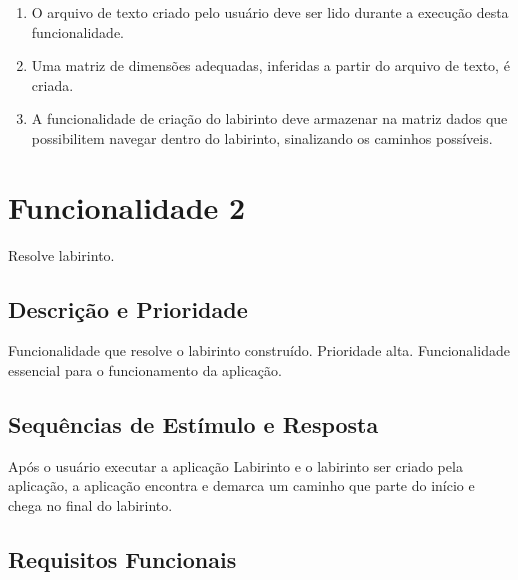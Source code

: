 
\begin{enumerate}
    \item O arquivo de texto criado pelo usuário deve ser lido durante a execução desta funcionalidade.
    \item Uma matriz de dimensões adequadas, inferidas a partir do arquivo de texto, é criada.
    \item A funcionalidade de criação do labirinto deve armazenar na matriz dados que possibilitem navegar dentro do labirinto, sinalizando os caminhos possíveis.
\end{enumerate}

\section{Funcionalidade 2}

Resolve labirinto.

\subsection{Descrição e Prioridade}

Funcionalidade que resolve o labirinto construído. Prioridade alta. Funcionalidade essencial para o funcionamento da aplicação.

\subsection{Sequências de Estímulo e Resposta}

Após o usuário executar a aplicação Labirinto e o labirinto ser criado pela aplicação, a aplicação encontra e demarca um caminho que parte do início e chega no final do labirinto.

\subsection{Requisitos Funcionais}


